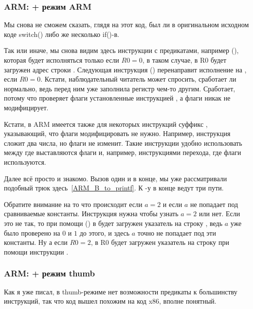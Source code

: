 ﻿%
\subsubsection{ARM: \OptimizingKeil + режим ARM}



Мы снова не сможем сказать, глядя на этот код, был ли в оригинальном исходном коде switch() либо же несколько
if()-в.

Так или иначе, мы снова видим здесь инструкции с предикатами, например  (), 
которая будет исполняться только
если $R0=0$, в таком случае, в R0 будет загружен адрес строки . 
Следующая инструкция  () перенаправит
исполнение на , если $R0=0$. 
Кстати, наблюдательный читатель может спросить, сработает ли  нормально,
ведь  перед ним уже заполнила регистр  чем-то другим. 
Сработает, потому что  проверяет флаги установленные
инструкцией \CMP, а  флаги никак не модифицирует.

Кстати, в ARM имеется также для некоторых инструкций суффикс , указывающий, что флаги модифицировать не нужно.
Например, инструкция  сложит два числа, но флаги не изменит. Такие инструкции удобно использовать
между \CMP где выставляются флаги и, например, инструкциями перехода, где флаги используются.

Далее всё просто и знакомо. Вызов \printf один и в конце, мы уже рассматривали подобный трюк 
здесь~\ref{ARM_B_to_printf}. К \printf{}-у в конце ведут три пути. 

Обратите внимание на то что происходит
если $a=2$ и если $a$ не попадает под сравниваемые константы. Инструкция  нужна чтобы узнать
$a=2$ или нет. Если это не так, то при помощи  () в  будет загружен указатель на 
строку ,
ведь $a$ уже было проверено на $0$ и $1$ до этого, и здесь $a$ точно не попадает под эти константы. 
Ну а если $R0=2$,
в R0 будет загружен указатель на строку  при помощи инструкции .

\subsubsection{ARM: \OptimizingKeil + режим thumb}



Как я уже писал, в thumb-режиме нет возможности  предикаты к большинству инструкций,
так что код вышел похожим на код x86, вполне понятный.

